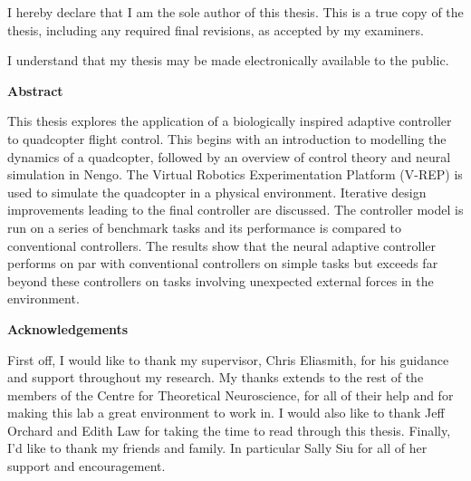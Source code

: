 \cleardoublepage %
 


  \noindent
I hereby declare that I am the sole author of this thesis. This is a true copy of the thesis, including any required final revisions, as accepted by my examiners.

  \bigskip
  
  \noindent
I understand that my thesis may be made electronically available to the public.

\cleardoublepage


\begin{center}\textbf{Abstract}\end{center}

This thesis explores the application of a biologically inspired adaptive controller to quadcopter flight control.
This begins with an introduction to modelling the dynamics of a quadcopter, followed by an overview of control theory and neural simulation in Nengo.
The Virtual Robotics Experimentation Platform (V-REP) is used to simulate the quadcopter in a physical environment.
Iterative design improvements leading to the final controller are discussed.
The controller model is run on a series of benchmark tasks and its performance is compared to conventional controllers. 
The results show that the neural adaptive controller performs on par with conventional controllers on simple tasks but exceeds far beyond these controllers on tasks involving unexpected external forces in the environment.

\cleardoublepage


\begin{center}\textbf{Acknowledgements}\end{center}


First off, I would like to thank my supervisor, Chris Eliasmith, for his guidance and support throughout my research.
My thanks extends to the rest of the members of the Centre for Theoretical Neuroscience, for all of their help and for making this lab a great environment to work in.
I would also like to thank Jeff Orchard and Edith Law for taking the time to read through this thesis.
Finally, I'd like to thank my friends and family.
In particular Sally Siu for all of her support and encouragement.
\cleardoublepage

